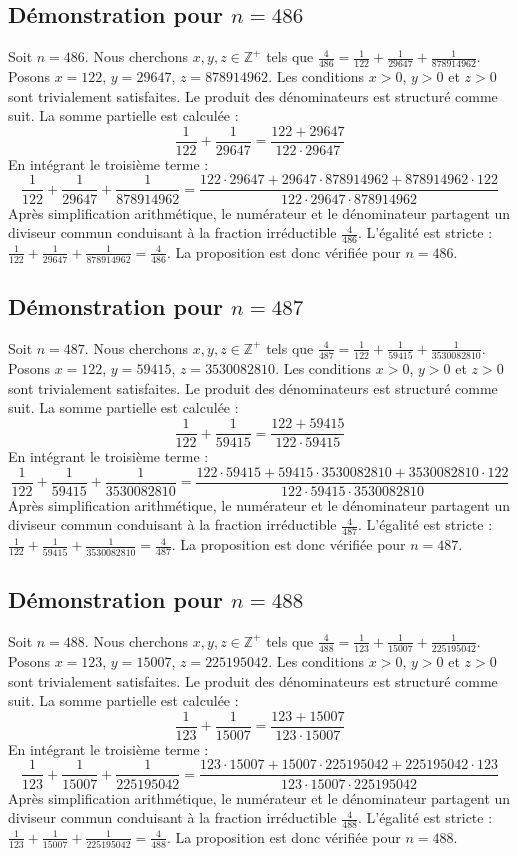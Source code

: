 \documentclass[11pt,a4paper]{article}
\begin{document}
\subsection{Démonstration pour $n = 486$}
Soit $n = 486$. Nous cherchons $x, y, z \in \mathbb{Z}^{+}$ tels que $\frac{4}{486} = \frac{1}{122} + \frac{1}{29647} + \frac{1}{878914962}$.
Posons $x = 122$, $y = 29647$, $z = 878914962$.
Les conditions $x > 0$, $y > 0$ et $z > 0$ sont trivialement satisfaites.
Le produit des dénominateurs est structuré comme suit. La somme partielle est calculée :
$$ \frac{1}{122} + \frac{1}{29647} = \frac{122+29647}{122 \cdot 29647} $$
En intégrant le troisième terme :
$$ \frac{1}{122} + \frac{1}{29647} + \frac{1}{878914962} = \frac{122 \cdot 29647 + 29647 \cdot 878914962 + 878914962 \cdot 122}{122 \cdot 29647 \cdot 878914962} $$
Après simplification arithmétique, le numérateur et le dénominateur partagent un diviseur commun conduisant à la fraction irréductible $\frac{4}{486}$.
L'égalité est stricte : $\frac{1}{122} + \frac{1}{29647} + \frac{1}{878914962} = \frac{4}{486}$.
La proposition est donc vérifiée pour $n = 486$.
\subsection{Démonstration pour $n = 487$}
Soit $n = 487$. Nous cherchons $x, y, z \in \mathbb{Z}^{+}$ tels que $\frac{4}{487} = \frac{1}{122} + \frac{1}{59415} + \frac{1}{3530082810}$.
Posons $x = 122$, $y = 59415$, $z = 3530082810$.
Les conditions $x > 0$, $y > 0$ et $z > 0$ sont trivialement satisfaites.
Le produit des dénominateurs est structuré comme suit. La somme partielle est calculée :
$$ \frac{1}{122} + \frac{1}{59415} = \frac{122+59415}{122 \cdot 59415} $$
En intégrant le troisième terme :
$$ \frac{1}{122} + \frac{1}{59415} + \frac{1}{3530082810} = \frac{122 \cdot 59415 + 59415 \cdot 3530082810 + 3530082810 \cdot 122}{122 \cdot 59415 \cdot 3530082810} $$
Après simplification arithmétique, le numérateur et le dénominateur partagent un diviseur commun conduisant à la fraction irréductible $\frac{4}{487}$.
L'égalité est stricte : $\frac{1}{122} + \frac{1}{59415} + \frac{1}{3530082810} = \frac{4}{487}$.
La proposition est donc vérifiée pour $n = 487$.
\subsection{Démonstration pour $n = 488$}
Soit $n = 488$. Nous cherchons $x, y, z \in \mathbb{Z}^{+}$ tels que $\frac{4}{488} = \frac{1}{123} + \frac{1}{15007} + \frac{1}{225195042}$.
Posons $x = 123$, $y = 15007$, $z = 225195042$.
Les conditions $x > 0$, $y > 0$ et $z > 0$ sont trivialement satisfaites.
Le produit des dénominateurs est structuré comme suit. La somme partielle est calculée :
$$ \frac{1}{123} + \frac{1}{15007} = \frac{123+15007}{123 \cdot 15007} $$
En intégrant le troisième terme :
$$ \frac{1}{123} + \frac{1}{15007} + \frac{1}{225195042} = \frac{123 \cdot 15007 + 15007 \cdot 225195042 + 225195042 \cdot 123}{123 \cdot 15007 \cdot 225195042} $$
Après simplification arithmétique, le numérateur et le dénominateur partagent un diviseur commun conduisant à la fraction irréductible $\frac{4}{488}$.
L'égalité est stricte : $\frac{1}{123} + \frac{1}{15007} + \frac{1}{225195042} = \frac{4}{488}$.
La proposition est donc vérifiée pour $n = 488$.
\end{document}
